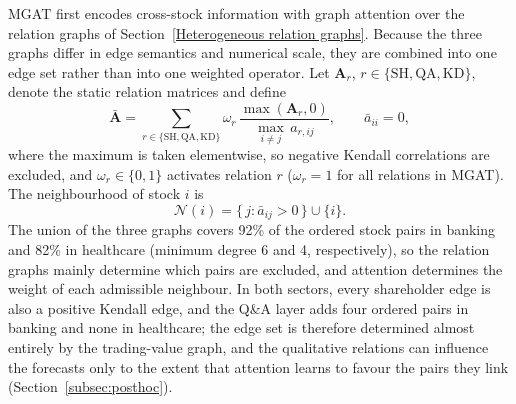\documentclass[pdflatex,sn-mathphys-num]{sn-jnl}%
\theoremstyle{thmstyleone}%
\theoremstyle{thmstyletwo}%
\theoremstyle{thmstylethree}%
\begin{document}
{\color{blue}MGAT first encodes cross-stock information with graph attention \citep{Velickovic2018GAT} over the relation graphs of Section~\ref{Heterogeneous relation graphs}. Because the three graphs differ in edge semantics and numerical scale, they are combined into one edge set rather than into one weighted operator. Let $\mathbf{A}_r$, $r\in\{\mathrm{SH},\mathrm{QA},\mathrm{KD}\}$, denote the static relation matrices and define
\begin{equation}
\bar{\mathbf{A}}=\sum_{r\in\{\mathrm{SH},\mathrm{QA},\mathrm{KD}\}}\omega_r\,\frac{\max(\mathbf{A}_r,0)}{\max_{i\neq j}\,a_{r,ij}},\qquad \bar a_{ii}=0,
\label{eq:Afused_re}
\end{equation}
where the maximum is taken elementwise, so negative Kendall correlations are excluded, and $\omega_r\in\{0,1\}$ activates relation $r$ ($\omega_r=1$ for all relations in MGAT). The neighbourhood of stock $i$ is
\begin{equation}
\mathcal{N}(i)=\{\,j:\bar a_{ij}>0\,\}\cup\{i\}.
\label{eq:neigh}
\end{equation}
The union of the three graphs covers 92\% of the ordered stock pairs in banking and 82\% in healthcare (minimum degree 6 and 4, respectively), so the relation graphs mainly determine which pairs are excluded, and attention determines the weight of each admissible neighbour. In both sectors, every shareholder edge is also a positive Kendall edge, and the Q\&A layer adds four ordered pairs in banking and none in healthcare; the edge set is therefore determined almost entirely by the trading-value graph, and the qualitative relations can influence the forecasts only to the extent that attention learns to favour the pairs they link (Section~\ref{subsec:posthoc}).

}
\end{document}
